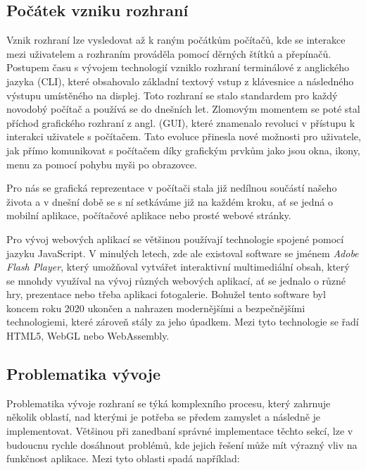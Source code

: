\subsection{Počátek vzniku rozhraní}
\label{subsec:ui-gui-theory-beginning}
Vznik rozhraní lze vysledovat až k raným počátkům počítačů, kde se interakce mezi uživatelem a rozhraním prováděla pomocí děrných štítků a přepínačů. Postupem času s vývojem technologií vzniklo rozhraní terminálové z anglického jazyka \textit{} (CLI), které obsahovalo základní textový vstup z klávesnice a následného výstupu umístěného na displej. Toto rozhraní se stalo standardem pro každý novodobý počítač a používá se do dnešních let. Zlomovým momentem se poté stal příchod grafického rozhraní z angl. \textit{} (GUI), které znamenalo revoluci v přístupu k interakci uživatele s počítačem. Tato evoluce přinesla nové možnosti pro uživatele, jak přímo komunikovat s počítačem díky grafickým prvkům jako jsou okna, ikony, menu za pomocí pohybu myši po obrazovce.

Pro nás se grafická reprezentace v počítači stala již nedílnou součástí našeho života a v dnešní době se s ní setkáváme již na každém kroku, ať se jedná o mobilní aplikace, počítačové aplikace nebo prosté webové stránky.

Pro vývoj webových aplikací se většinou používají technologie spojené pomocí jazyku JavaScript. V minulých letech, zde ale existoval software se jménem \textit{Adobe Flash Player}, který umožňoval vytvářet interaktivní multimediální obsah, který se mnohdy využíval na vývoj různých webových aplikací, ať se jednalo o různé hry, prezentace nebo třeba aplikaci fotogalerie. Bohužel tento software byl koncem roku 2020 ukončen a nahrazen modernějšími a bezpečnějšími technologiemi, které zároveň stály za jeho úpadkem. Mezi tyto technologie se řadí HTML5, WebGL nebo WebAssembly. \cite{adobeFlashPlayer-eol}

\subsection{Problematika vývoje}
\label{subsec:ui-gui-theory-problems}
Problematika vývoje rozhraní se týká komplexního procesu, který zahrnuje několik oblastí, nad kterými je potřeba se předem zamyslet a následně je implementovat. Většinou při zanedbaní správné implementace těchto sekcí, lze v budoucnu rychle dosáhnout problémů, kde jejich řešení může mít výrazný vliv na funkčnost aplikace. Mezi tyto oblasti spadá například:

